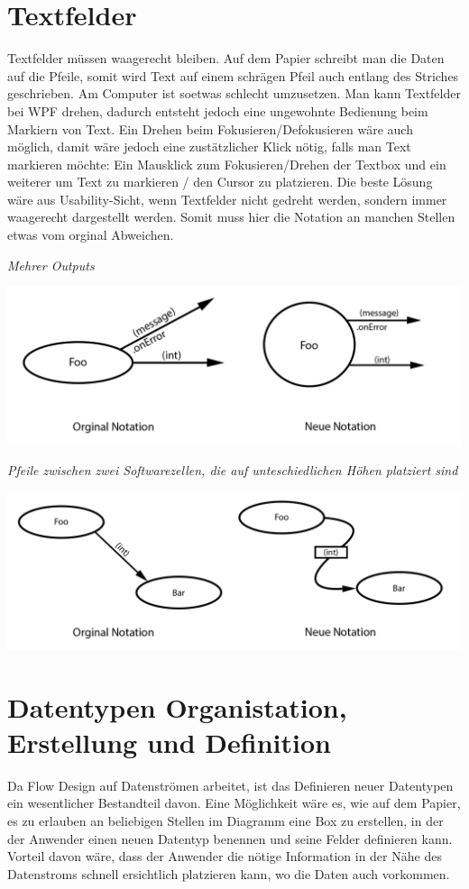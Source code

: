 \documentclass[a4paper,12pt,oneside]{book}
\begin{document}
\section{Textfelder}
\label{sec:orgheadline23}
Textfelder müssen waagerecht bleiben. Auf dem Papier schreibt man die Daten auf
die Pfeile, somit wird Text auf einem schrägen Pfeil auch entlang des Striches
geschrieben.
Am Computer ist soetwas schlecht umzusetzen. Man kann Textfelder bei WPF drehen, dadurch
entsteht jedoch eine ungewohnte Bedienung beim Markiern von Text. Ein Drehen
beim Fokusieren/Defokusieren wäre auch möglich, damit wäre jedoch eine zustätzlicher
Klick nötig, falls man Text markieren möchte: Ein Mausklick zum Fokusieren/Drehen
der Textbox und ein weiterer um Text zu markieren / den Cursor zu platzieren.
Die beste Lösung wäre aus Usability-Sicht, wenn Textfelder nicht gedreht werden,
sondern immer waagerecht dargestellt werden. Somit muss hier die Notation an
manchen Stellen etwas vom orginal Abweichen.

\pagebreak
\emph{Mehrer Outputs}



\includegraphics[width=.9\linewidth]{./img/NotationChanges1.jpg}
\bigskip

\emph{
Pfeile zwischen zwei Softwarezellen, die auf unteschiedlichen Höhen platziert
sind}

\includegraphics[width=.9\linewidth]{./img/NotationChanges2.jpg}



\section{Datentypen Organistation, Erstellung und Definition}
\label{sec:orgheadline24}
Da Flow Design auf Datenströmen arbeitet, ist das Definieren neuer Datentypen
ein wesentlicher Bestandteil davon.
Eine Möglichkeit wäre es, wie auf dem Papier, es zu erlauben an beliebigen
Stellen im Diagramm eine Box zu erstellen, in der der Anwender einen neuen
Datentyp benennen und seine Felder definieren kann. Vorteil davon wäre, dass der
Anwender die nötige Information in der Nähe des Datenstroms schnell ersichtlich
platzieren kann, wo die Daten auch vorkommen.
\end{document}

